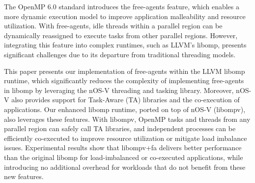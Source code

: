 The OpenMP 6.0 standard introduces the free-agents feature, which enables a more dynamic execution model to improve application malleability and resource utilization. With free-agents, idle threads within a parallel region can be dynamically reassigned to execute tasks from other parallel regions. However, integrating this feature into complex runtimes, such as LLVM’s libomp, presents significant challenges due to its departure from traditional threading models.

This paper presents our implementation of free-agents within the LLVM libomp runtime, which significantly reduces the complexity of implementing free-agents in libomp by leveraging the nOS-V threading and tasking library. Moreover, nOS-V also provides support for Task-Aware (TA) libraries and the co-execution of applications. Our enhanced libomp runtime, ported on top of nOS-V (libompv), also leverages these features. With libompv, OpenMP tasks and threads from any parallel region can safely call TA libraries, and independent processes can be efficiently co-executed to improve resource utilization or mitigate load imbalance issues. Experimental results show that libompv+fa delivers better performance than the original libomp for load-imbalanced or co-executed applications, while introducing no additional overhead for workloads that do not benefit from these new features.
